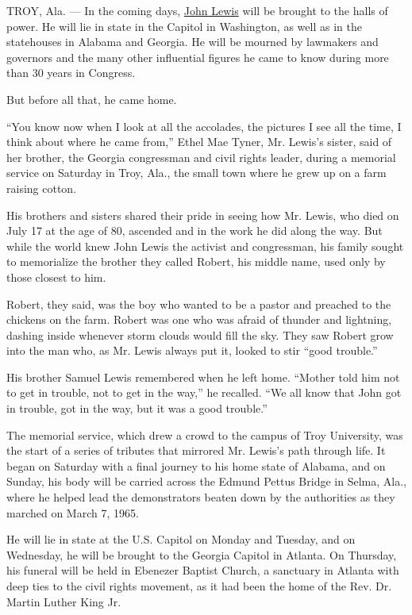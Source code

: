 TROY, Ala. --- In the coming days,
\href{https://www.nytimes3xbfgragh.onion/2020/07/25/us/john-lewis-memorial-service.html}{John
Lewis} will be brought to the halls of power. He will lie in state in
the Capitol in Washington, as well as in the statehouses in Alabama and
Georgia. He will be mourned by lawmakers and governors and the many
other influential figures he came to know during more than 30 years in
Congress.

But before all that, he came home.

``You know now when I look at all the accolades, the pictures I see all
the time, I think about where he came from,'' Ethel Mae Tyner, Mr.
Lewis's sister, said of her brother, the Georgia congressman and civil
rights leader, during a memorial service on Saturday in Troy, Ala., the
small town where he grew up on a farm raising cotton.

His brothers and sisters shared their pride in seeing how Mr. Lewis, who
died on July 17 at the age of 80, ascended and in the work he did along
the way. But while the world knew John Lewis the activist and
congressman, his family sought to memorialize the brother they called
Robert, his middle name, used only by those closest to him.

Robert, they said, was the boy who wanted to be a pastor and preached to
the chickens on the farm. Robert was one who was afraid of thunder and
lightning, dashing inside whenever storm clouds would fill the sky. They
saw Robert grow into the man who, as Mr. Lewis always put it, looked to
stir ``good trouble.''

His brother Samuel Lewis remembered when he left home. ``Mother told him
not to get in trouble, not to get in the way,'' he recalled. ``We all
know that John got in trouble, got in the way, but it was a good
trouble.''

The memorial service, which drew a crowd to the campus of Troy
University, was the start of a series of tributes that mirrored Mr.
Lewis's path through life. It began on Saturday with a final journey to
his home state of Alabama, and on Sunday, his body will be carried
across the Edmund Pettus Bridge in Selma, Ala., where he helped lead the
demonstrators beaten down by the authorities as they marched on March 7,
1965.

He will lie in state at the U.S. Capitol on Monday and Tuesday, and on
Wednesday, he will be brought to the Georgia Capitol in Atlanta. On
Thursday, his funeral will be held in Ebenezer Baptist Church, a
sanctuary in Atlanta with deep ties to the civil rights movement, as it
had been the home of the Rev. Dr. Martin Luther King Jr.

